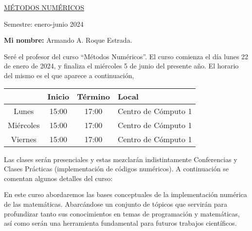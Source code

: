\documentclass[12pt]{amsart} %
\begin{document}

\uline{\LARGE{MÉTODOS NUMÉRICOS}}%

\vspace{14pt}

\large{Semestre: enero-junio 2024}

\vspace{14pt}


\textbf{Mi nombre:} Armando A. Roque Estrada.

\vspace{8pt}

\hspace{0.375in} Seré el profesor del curso ``Métodos Numéricos''. El curso comienza el día lunes 22 de enero de 2024, y finaliza el miércoles 5 de junio del presente a\~no. El horario del mismo es el que aparece a continuación,
\begin{table}[h]
	\begin{tabular}{c| c| c| l}
		& Inicio & Término& Local \\
		\hline
		Lunes & 15:00  & 17:00 & Centro de Cómputo 1\\
		Miércoles & 15:00 & 17:00 &  Centro de Cómputo 1\\
		Viernes & 15:00 & 17:00 &  Centro de Cómputo 1 \\\hline
	\end{tabular}
\end{table}

Las clases serán presenciales y estas mezclarán indistintamente Conferencias y Clases Prácticas (implementación de códigos numéricos). A continuación se comentan algunos detalles del curso:
\vspace{8pt}


En este curso abordaremos las bases conceptuales de la implementación numérica de las matemáticas. Abarcándose un conjunto de tópicos que servirán para profundizar tanto sus conocimientos en temas de programación y matemáticas, así como serán una herramienta fundamental para futuros trabajos científicos.
\end{document}
